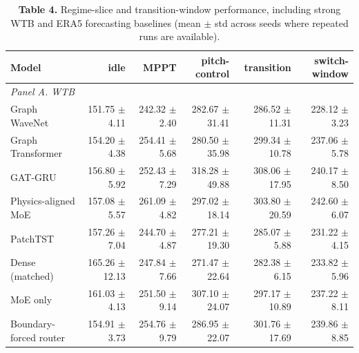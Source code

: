 \begin{table}[t]
\centering
\scriptsize
\setlength{\tabcolsep}{3pt}
\renewcommand{\arraystretch}{1.04}
\caption*{\textbf{Table 4.} Regime-slice and transition-window performance, including strong WTB and ERA5 forecasting baselines (mean $\pm$ std across seeds where repeated runs are available).}
\begin{tabular}{lrrrrr}
\toprule
Model & idle & MPPT & pitch-control & transition & switch-window \\
\midrule
\multicolumn{6}{l}{\textit{Panel A. WTB}} \\
Graph WaveNet & 151.75 $\pm$ 4.11 & 242.32 $\pm$ 2.40 & 282.67 $\pm$ 31.41 & 286.52 $\pm$ 11.31 & 228.12 $\pm$ 3.23 \\
Graph Transformer & 154.20 $\pm$ 4.38 & 254.41 $\pm$ 5.68 & 280.50 $\pm$ 35.98 & 299.34 $\pm$ 10.78 & 237.06 $\pm$ 5.78 \\
GAT-GRU & 156.80 $\pm$ 5.92 & 252.43 $\pm$ 7.29 & 318.28 $\pm$ 49.88 & 308.06 $\pm$ 17.95 & 240.17 $\pm$ 8.50 \\
Physics-aligned MoE & 157.08 $\pm$ 5.57 & 261.09 $\pm$ 4.82 & 297.02 $\pm$ 18.14 & 303.80 $\pm$ 20.59 & 242.60 $\pm$ 6.07 \\
PatchTST & 157.26 $\pm$ 7.04 & 244.70 $\pm$ 4.87 & 277.21 $\pm$ 19.30 & 285.07 $\pm$ 5.88 & 231.22 $\pm$ 4.15 \\
Dense (matched) & 165.26 $\pm$ 12.13 & 247.84 $\pm$ 7.66 & 271.47 $\pm$ 22.64 & 282.38 $\pm$ 6.15 & 233.82 $\pm$ 5.96 \\
MoE only & 161.03 $\pm$ 4.13 & 251.50 $\pm$ 9.14 & 307.10 $\pm$ 24.07 & 297.17 $\pm$ 10.89 & 237.22 $\pm$ 8.11 \\
Boundary-forced router & 154.91 $\pm$ 3.73 & 254.76 $\pm$ 9.79 & 286.95 $\pm$ 22.07 & 301.76 $\pm$ 17.69 & 239.86 $\pm$ 8.85 \\
\bottomrule
\end{tabular}


\end{table}
